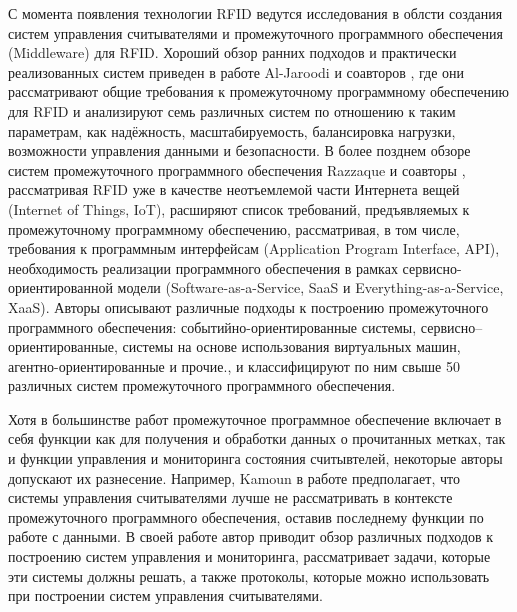 С момента появления технологии RFID ведутся исследования в облсти создания систем управления считывателями и промежуточного программного обеспечения (Middleware) для RFID. Хороший обзор ранних подходов и практически реализованных систем приведен в работе Al-Jaroodi и соавторов \cite{Al-Jaroodi2009}, где они рассматривают общие требования к промежуточному программному обеспечению для RFID и анализируют семь различных систем по отношению к таким параметрам, как надёжность, масштабируемость, балансировка нагрузки, возможности управления данными и безопасности. В более позднем обзоре систем промежуточного программного обеспечения Razzaque и соавторы \cite{Razzaque2016}, рассматривая RFID уже в качестве неотъемлемой части Интернета вещей (Internet of Things, IoT), расширяют список требований, предъявляемых к промежуточному программному обеспечению, рассматривая, в том числе, требования к программным интерфейсам (Application Program Interface, API), необходимость реализации программного обеспечения в рамках сервисно-ориентированной модели (Software-as-a-Service, SaaS и Everything-as-a-Service, XaaS). Авторы описывают различные подходы к построению промежуточного программного обеспечения: событийно-ориентированные системы, сервисно--ориентированные, системы на основе использования виртуальных машин, агентно-ориентированные и прочие., и классифицируют по ним свыше 50 различных систем промежуточного программного обеспечения.

Хотя в большинстве работ промежуточное программное обеспечение включает в себя функции как для получения и обработки данных о прочитанных метках, так и функции управления и мониторинга состояния считывтелей, некоторые авторы допускают их разнесение. Например, Kamoun в работе \cite{Kamoun2009} предполагает, что системы управления считывателями лучше не рассматривать в контексте промежуточного программного обеспечения, оставив последнему функции по работе с данными. В своей работе автор приводит обзор различных подходов к построению систем управления и мониторинга, рассматривает задачи, которые эти системы должны решать, а также протоколы, которые можно использовать при построении систем управления считывателями.

